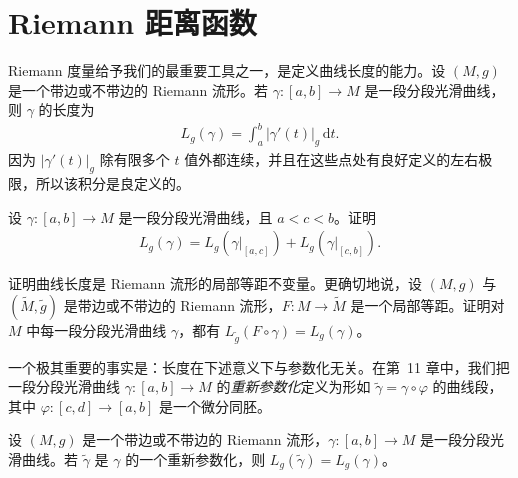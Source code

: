 \documentclass[../../main.tex]{subfiles}
\begin{document}
\section{Riemann 距离函数}\label{section:ch13-distance-function}

Riemann 度量给予我们的最重要工具之一，是定义曲线长度的能力。设 $(M,g)$ 是一个带边或不带边的 Riemann 流形。若 $\gamma:[a,b]\to M$ 是一段分段光滑曲线，则 $\gamma$ 的长度为
\begin{align*}
L_g(\gamma)=\int_a^b |\gamma'(t)|_g\,\mathrm{d}t.
\end{align*}
因为 $|\gamma'(t)|_g$ 除有限多个 $t$ 值外都连续，并且在这些点处有良好定义的左右极限，所以该积分是良定义的。

\begin{exercise}\label{exercise:ch13-23}
设 $\gamma:[a,b]\to M$ 是一段分段光滑曲线，且 $a<c<b$。证明
\begin{align*}
L_g(\gamma)=L_g(\gamma|_{[a,c]})+L_g(\gamma|_{[c,b]}).
\end{align*}
\end{exercise}

\begin{exercise}\label{exercise:ch13-24}
证明曲线长度是 Riemann 流形的局部等距不变量。更确切地说，设 $(M,g)$ 与 $(\widetilde M,\widetilde g)$ 是带边或不带边的 Riemann 流形，$F:M\to\widetilde M$ 是一个局部等距。证明对 $M$ 中每一段分段光滑曲线 $\gamma$，都有 $L_{\widetilde g}(F\circ\gamma)=L_g(\gamma)$。
\end{exercise}

一个极其重要的事实是：长度在下述意义下与参数化无关。在第~11 章中，我们把一段分段光滑曲线 $\gamma:[a,b]\to M$ 的\emph{重新参数化}定义为形如 $\widetilde\gamma=\gamma\circ\varphi$ 的曲线段，其中 $\varphi:[c,d]\to[a,b]$ 是一个微分同胚。

\begin{proposition}[长度的参数无关性]\label{proposition:ch13-length-param-indep}
设 $(M,g)$ 是一个带边或不带边的 Riemann 流形，$\gamma:[a,b]\to M$ 是一段分段光滑曲线。若 $\widetilde\gamma$ 是 $\gamma$ 的一个重新参数化，则 $L_g(\widetilde\gamma)=L_g(\gamma)$。
\end{proposition}
\end{document}
